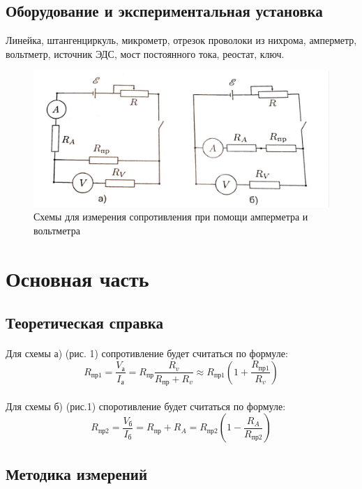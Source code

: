 \documentclass[14pt, a4paper]{scrartcl}
\begin{document}
\subsection{Оборудование и экспериментальная установка}
Линейка, штангенциркуль, микрометр, отрезок проволоки из нихрома, амперметр, вольтметр, источник ЭДС, мост постоянного тока, реостат, ключ.
\begin{figure}
\centering
\includegraphics[scale=0.2]{12schemes.jpg}
\caption{Схемы для измерения сопротивления при помощи амперметра и вольтметра}
\label{fig:scheme12}
\end{figure}

\section{Основная часть}
\subsection{Теоретическая справка}
\paragraph{}
 Для схемы а) (рис. 1) сопротивление будет считаться по формуле:
\begin{equation}
R_\text{пр1}=  \frac{V_\text{а}}{I_\text{а}}=R_\text{пр}\frac{R_v}{R_\text{пр}+R_v}\approx R_\text{пр1}(1+\frac{R_\text{пр1}}{R_v})
\end{equation}
\paragraph{}
Для схемы б) (рис.1) споротивление будет считаться по формуле:
\begin{equation}
R_\text{пр2}=  \frac{V_\text{б}}{I_\text{б}}=R_\text{пр}+R_A=R_\text{пр2}(1-\frac{R_A}{R_\text{пр2}})
\end{equation}
\subsection{Методика измерений}
\end{document}
